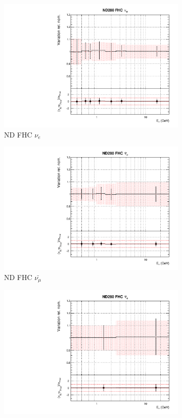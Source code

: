 \begin{figure}
\begin{subfigure}{0.24\textwidth}
  \includegraphics[width=0.95\linewidth]{figs/asmvflux1}
  \caption{ND FHC $\nu_e$}
\end{subfigure}
\begin{subfigure}{0.24\textwidth}
  \centering
  \includegraphics[width=0.95\linewidth]{figs/asmvflux2}
  \caption{ND FHC $\bar{\nu_{\mu}}$}
\end{subfigure}
\begin{subfigure}{0.24\textwidth}
  \centering
  \includegraphics[width=0.95\linewidth]{figs/asmvflux3}

\end{subfigure}
\end{figure}
